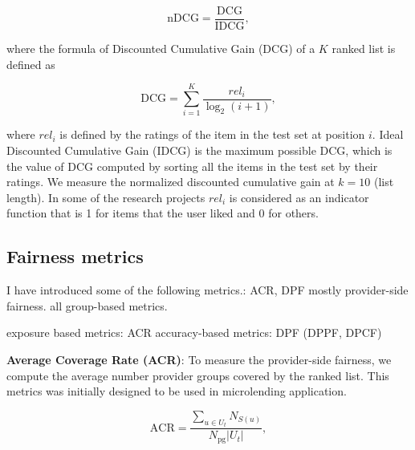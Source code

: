         \begin{equation}
        \text{nDCG}=\frac{\text{DCG}}{\text{IDCG}},
        \label{eq:ndcg}
        \end{equation}
        
        where the formula of Discounted Cumulative Gain (DCG) of a $K$ ranked list is defined as
        
        \begin{equation}
        \text{DCG}=\sum_{i=1}^K\frac{{rel}_i}{\log_2(i+1)},
        \end{equation}
        
        where ${rel}_i$ is defined by the ratings of the item in the test set at position $i$. Ideal Discounted Cumulative Gain (IDCG) is the maximum possible DCG, which is the value of DCG computed by sorting all the items in the test set by their ratings.
        We measure the normalized discounted cumulative gain at $k=10$ (list length). In some of the research projects ${rel}_i$ is considered as an indicator function that is 1 for items that the user liked and 0 for others.
        
    
    \subsection{Fairness metrics}
    
        
        I have introduced some of the following metrics.: ACR, DPF
        mostly provider-side fairness.
        all group-based metrics.
        
        exposure based metrics: ACR
        accuracy-based metrics: DPF (DPPF, DPCF)
        
        
        
        \textbf{Average Coverage Rate (ACR)}: To measure the provider-side fairness, we compute the average number provider groups covered by the ranked list. This metrics was initially designed to be used in microlending application.
        
        \begin{equation}
            \text{ACR}=\frac{\sum_{u\in U_t}N_{S(u)}}{N_\text{pg}|U_t|},
        \end{equation}
        
